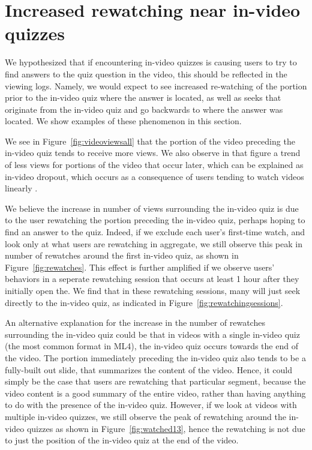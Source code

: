 \documentclass{sigchi}
\begin{document}
\section{Increased rewatching near in-video quizzes}

We hypothesized that if encountering in-video quizzes is causing users to try to find answers to the quiz question in the video, this should be reflected in the viewing logs. Namely, we would expect to see increased re-watching of the portion prior to the in-video quiz where the answer is located, as well as seeks that originate from the in-video quiz and go backwards to where the answer was located. We show examples of these phenomenon in this section.

We see in Figure~\ref{fig:videoviewsall} that the portion of the video preceding the in-video quiz tends to receive more views. We also observe in that figure a trend of less views for portions of the video that occur later, which can be explained as in-video dropout, which occurs as a consequence of users tending to watch videos linearly \cite{juho}.

We believe the increase in number of views surrounding the in-video quiz is due to the user rewatching the portion preceding the in-video quiz, perhaps hoping to find an answer to the quiz. Indeed, if we exclude each user's first-time watch, and look only at what users are rewatching in aggregate, we still observe this peak in number of rewatches around the first in-video quiz, as shown in Figure~\ref{fig:rewatches}. This effect is further amplified if we observe users' behaviors in a seperate rewatching session that occurs at least 1 hour after they initially open the. We find that in these rewatching sessions, many will just seek directly to the in-video quiz, as indicated in Figure~\ref{fig:rewatchingsessions}.

An alternative explanation for the increase in the number of rewatches surrounding the in-video quiz could be that in videos with a single in-video quiz (the most common format in ML4), the in-video quiz occurs towards the end of the video. The portion immediately preceding the in-video quiz also tends to be a fully-built out slide, that summarizes the content of the video. Hence, it could simply be the case that users are rewatching that particular segment, because the video content is a good summary of the entire video, rather than having anything to do with the presence of the in-video quiz. However, if we look at videos with multiple in-video quizzes, we still observe the peak of rewatching around the in-video quizzes as shown in Figure~\ref{fig:watched13}, hence the rewatching is not due to just the position of the in-video quiz at the end of the video.
\end{document}
